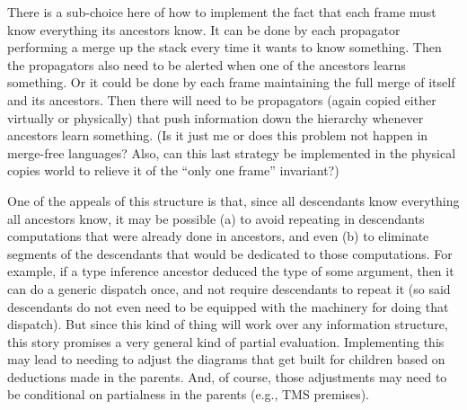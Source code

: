 \documentclass{article}
\begin{document}
There is a sub-choice here of how to implement the fact that each
frame must know everything its ancestors know.  It can be done by
each propagator performing a merge up the stack every time it
wants to know something.  Then the propagators also need to be
alerted when one of the ancestors learns something.  Or it could
be done by each frame maintaining the full merge of itself and its
ancestors.  Then there will need to be propagators (again copied
either virtually or physically) that push information down the
hierarchy whenever ancestors learn something.  (Is it just me or
does this problem not happen in merge-free languages?  Also, can
this last strategy be implemented in the physical copies world to
relieve it of the ``only one frame'' invariant?)

One of the appeals of this structure is that, since all
descendants know everything all ancestors know, it may be possible
(a) to avoid repeating in descendants computations that were
already done in ancestors, and even (b) to eliminate segments of
the descendants that would be dedicated to those computations.
For example, if a type inference ancestor deduced the type of some
argument, then it can do a generic dispatch once, and not require
descendants to repeat it (so said descendants do not even need to
be equipped with the machinery for doing that dispatch).  But
since this kind of thing will work over any information structure,
this story promises a very general kind of partial evaluation.
Implementing this may lead to needing to adjust the diagrams that
get built for children based on deductions made in the parents.
And, of course, those adjustments may need to be conditional on
partialness in the parents (e.g., TMS premises).
\end{document}
